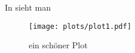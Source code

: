 \documentclass{scrartcl}
\begin{document}
In sieht man
\begin{figure}
  \centering
  \texttt{[image: plots/plot1.pdf]}
  \caption{ein schöner Plot}
\end{figure}
\end{document}
